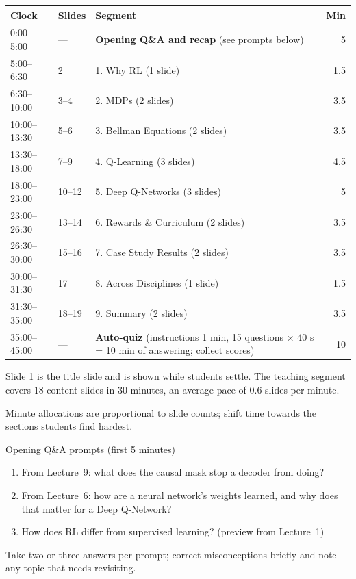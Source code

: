 \documentclass[11pt]{article}
\begin{document}
\begin{center}\small\renewcommand{\arraystretch}{1.2}\begin{tabularx}{\textwidth}{@{}l l X r@{}}\toprule\textbf{Clock} & \textbf{Slides} & \textbf{Segment} & \textbf{Min}\\\midrule

0:00--5:00 & --- & \textbf{Opening Q\&A and recap} (see prompts below) & 5\\

5:00--6:30 & 2 & 1. Why RL (1 slide) & 1.5\\

6:30--10:00 & 3--4 & 2. MDPs (2 slides) & 3.5\\

10:00--13:30 & 5--6 & 3. Bellman Equations (2 slides) & 3.5\\

13:30--18:00 & 7--9 & 4. Q-Learning (3 slides) & 4.5\\

18:00--23:00 & 10--12 & 5. Deep Q-Networks (3 slides) & 5\\

23:00--26:30 & 13--14 & 6. Rewards \& Curriculum (2 slides) & 3.5\\

26:30--30:00 & 15--16 & 7. Case Study Results (2 slides) & 3.5\\

30:00--31:30 & 17 & 8. Across Disciplines (1 slide) & 1.5\\

31:30--35:00 & 18--19 & 9. Summary (2 slides) & 3.5\\

35:00--45:00 & --- & \textbf{Auto-quiz} (instructions 1 min, 15 questions $\times$ 40 s = 10 min of answering; collect scores) & 10\\\bottomrule\end{tabularx}\end{center}

Slide 1 is the title slide and is shown while students settle. The teaching segment covers 18 content slides in 30 minutes, an average pace of 0.6 slides per minute. 

Minute allocations are proportional to slide counts; shift time towards the sections students find hardest.

\begin{instr}{Opening Q\&A prompts (first 5 minutes)}\begin{enumerate}\item From Lecture~9: what does the causal mask stop a decoder from doing?\item From Lecture~6: how are a neural network's weights learned, and why does that matter for a Deep Q-Network?\item How does RL differ from supervised learning? (preview from Lecture~1)\end{enumerate}Take two or three answers per prompt; correct misconceptions briefly and note any topic that needs revisiting.\end{instr}
\end{document}
